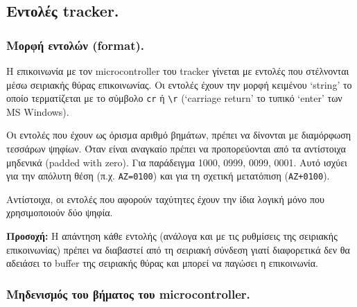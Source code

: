 \documentclass[
  a4paper,
  twoside,
  titlepage,
  12pt]{article}
\numberwithin{equation}{section}
\numberwithin{figure}{section}
\numberwithin{table}{section}
\begin{document}
\normalsize

\hypertarget{ux3b5ux3bdux3c4ux3bfux3bbux3adux3c2-tracker.}{%
\subsection{Εντολές tracker.}\label{ux3b5ux3bdux3c4ux3bfux3bbux3adux3c2-tracker.}}

\hypertarget{ux3bcux3bfux3c1ux3c6ux3ae-ux3b5ux3bdux3c4ux3bfux3bbux3ceux3bd-format.}{%
\subsubsection{Μορφή εντολών (format).}\label{ux3bcux3bfux3c1ux3c6ux3ae-ux3b5ux3bdux3c4ux3bfux3bbux3ceux3bd-format.}}

Η επικοινωνία με τον microcontroller του tracker γίνεται με εντολές που στέλνονται μέσω σειριακής θύρας επικοινωνίας. Οι εντολές έχουν την μορφή κειμένου `string' το οποίο τερματίζεται με το σύμβολο \texttt{\textquotesingle{}cr\textquotesingle{}} ή \texttt{\textquotesingle{}\textbackslash{}r\textquotesingle{}} (`carriage return' το τυπικό `enter' των MS Windows).

Οι εντολές που έχουν ως όρισμα αριθμό βημάτων, πρέπει να δίνονται με διαμόρφωση τεσσάρων ψηφίων. Όταν είναι αναγκαίο πρέπει να προπορεύονται από τα αντίστοιχα μηδενικά (padded with zero). Για παράδειγμα 1000, 0999, 0099, 0001. Αυτό ισχύει για την απόλυτη θέση (π.χ. \texttt{\textquotesingle{}AZ=0100\textquotesingle{}}) και για τη σχετική μετατόπιση (\texttt{\textquotesingle{}AZ+0100\textquotesingle{}}).

Αντίστοιχα, οι εντολές που αφορούν ταχύτητες έχουν την ίδια λογική μόνο που χρησιμοποιούν δύο ψηφία.

\textbf{Προσοχή:} Η απάντηση κάθε εντολής (ανάλογα και με τις ρυθμίσεις της σειριακής επικοινωνίας) πρέπει να διαβαστεί από τη σειριακή σύνδεση γιατί διαφορετικά δεν θα αδειάσει το buffer της σειριακής θύρας και μπορεί να παγώσει η επικοινωνία.

\hypertarget{ux3bcux3b7ux3b4ux3b5ux3bdux3b9ux3c3ux3bcux3ccux3c2-ux3c4ux3bfux3c5-ux3b2ux3aeux3bcux3b1ux3c4ux3bfux3c2-ux3c4ux3bfux3c5-microcontroller.}{%
\subsubsection{Μηδενισμός του βήματος του microcontroller.}\label{ux3bcux3b7ux3b4ux3b5ux3bdux3b9ux3c3ux3bcux3ccux3c2-ux3c4ux3bfux3c5-ux3b2ux3aeux3bcux3b1ux3c4ux3bfux3c2-ux3c4ux3bfux3c5-microcontroller.}}
\end{document}
